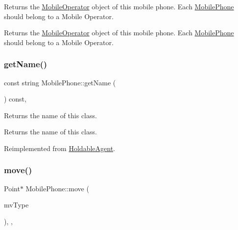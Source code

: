 Returns the \mbox{\hyperlink{class_mobile_operator}{Mobile\+Operator}} object of this mobile phone. Each \mbox{\hyperlink{class_mobile_phone}{Mobile\+Phone}} should belong to a Mobile Operator. \begin{DoxyReturn}{Returns}
the \mbox{\hyperlink{class_mobile_operator}{Mobile\+Operator}} object of this mobile phone. Each \mbox{\hyperlink{class_mobile_phone}{Mobile\+Phone}} should belong to a Mobile Operator. 
\end{DoxyReturn}
\mbox{\label{class_mobile_phone_a1eeac3141baafa75ebcf26fc3a0e4068}} 
\subsubsection{\texorpdfstring{getName()}{getName()}}
{\footnotesize\ttfamily const string Mobile\+Phone\+::get\+Name (\begin{DoxyParamCaption}{ }\end{DoxyParamCaption}) const\hspace{0.3cm}{\ttfamily [override]}, {\ttfamily [virtual]}}

Returns the name of this class. \begin{DoxyReturn}{Returns}
the name of this class. 
\end{DoxyReturn}


Reimplemented from \mbox{\hyperlink{class_holdable_agent_ab330bb40de51a957ef8826af629f94a2}{Holdable\+Agent}}.

\mbox{\label{class_mobile_phone_a92d77fa5810ddb9c4c482d9c9baea456}} 
\subsubsection{\texorpdfstring{move()}{move()}}
{\footnotesize\ttfamily Point$\ast$ Mobile\+Phone\+::move (\begin{DoxyParamCaption}\item[{\mbox{\hyperlink{_movement_type_8h_a8a93b61bc797a7d1907f42796a252493}{Movement\+Type}}}]{mv\+Type }\end{DoxyParamCaption})\hspace{0.3cm}{\ttfamily [inline]}, {\ttfamily [override]}, {\ttfamily [virtual]}}

